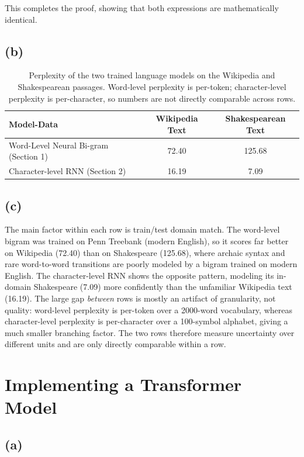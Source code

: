 \documentclass{article}
\begin{document}
This completes the proof, showing that both expressions are mathematically identical.

\subsection*{(b)}

\begin{table}[h]
    \centering
    \begin{tabular}{lcc}
        \hline
        Model-Data & Wikipedia Text & Shakespearean Text \\
        \hline
        Word-Level Neural Bi-gram (Section 1) & 72.40 & 125.68 \\
        Character-level RNN (Section 2)       & 16.19 & 7.09   \\
        \hline
    \end{tabular}
    \caption{Perplexity of the two trained language models on the Wikipedia and Shakespearean passages. Word-level perplexity is per-token; character-level perplexity is per-character, so numbers are not directly comparable across rows.}
    \label{tab:q3b_perplexity}
\end{table}

\subsection*{(c)}

The main factor within each row is train/test domain match. The word-level bigram was trained on Penn Treebank (modern English), so it scores far better on Wikipedia (72.40) than on Shakespeare (125.68), where archaic syntax and rare word-to-word transitions are poorly modeled by a bigram trained on modern English. The character-level RNN shows the opposite pattern, modeling its in-domain Shakespeare (7.09) more confidently than the unfamiliar Wikipedia text (16.19). The large gap \emph{between} rows is mostly an artifact of granularity, not quality: word-level perplexity is per-token over a 2000-word vocabulary, whereas character-level perplexity is per-character over a 100-symbol alphabet, giving a much smaller branching factor. The two rows therefore measure uncertainty over different units and are only directly comparable within a row.

\newpage
\section{Implementing a Transformer Model}
\subsection*{(a)}
\end{document}
